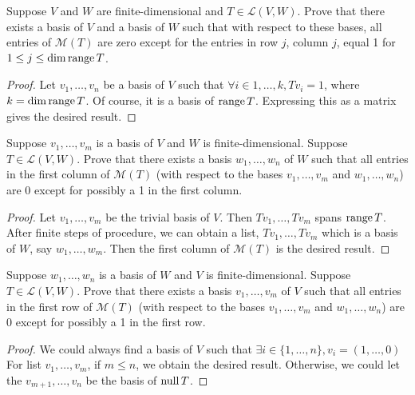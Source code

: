 \begin{exercise}
Suppose $V$ and $W$ are finite-dimensional and $T \in \mathcal{L}(V,W)$. Prove that there exists a basis of $V$ and a basis of $W$ such that with respect to these bases, all entries of $\mathcal{M}(T)$ are zero except for the entries in row $j$, column $j$, equal 1 for $1 \le j \le \operatorname{dim}\mathop{\mathrm{range}} T$.
\end{exercise}

\begin{proof}
	Let $v_1, \ldots , v_n$ be a basis of $V$ such that $\forall i \in {1, \ldots, k}, Tv_i = 1$,
	where $k = \operatorname{dim}\mathop{\mathrm{range}} T$.
	Of course, it is a basis of $\mathop{\mathrm{range}} T$. Expressing this as a matrix gives the desired result.
\end{proof}

\begin{exercise}
Suppose $v_1, \ldots ,v_m$ is a basis of $V$ and $W$ is finite-dimensional.
Suppose $T \in \mathcal{L}(V,W)$. Prove that there exists a basis $w_1, \ldots ,w_n$
of $W$ such that all entries in the first column of $\mathcal{M}(T)$ (with respect to
the bases $v_1, \ldots ,v_m$ and $w_1, \ldots ,w_n$) are 0 except for possibly a 1 in
the first column.
\end{exercise}
\begin{proof}
	Let $v_1 , \ldots , v_m$ be the trivial basis of $V$. Then $Tv_1, \ldots , Tv_m$ spans $\mathop{\mathrm{range}} T$. After finite steps of procedure, we can obtain a list, $Tv_1, \ldots ,Tv_m$ which is a basis of $W$, say $w_1, \ldots , w_m$. Then the first column of $\mathcal{M}(T)$ is the desired result.
\end{proof}

\begin{exercise}
Suppose $w_1, \ldots ,w_n$ is a basis of $W$ and $V$ is finite-dimensional. Suppose $T \in \mathcal{L}(V,W)$. Prove that there exists a basis $v_1, \ldots ,v_m$ of $V$ such that all entries in the first row of $\mathcal{M}(T)$ (with respect to the bases $v_1, \ldots ,v_m$ and $w_1, \ldots ,w_n$) are 0 except for possibly a 1 in the first row.
\end{exercise}
\begin{proof}
	We could always find a basis of $V$ such that $\exists i \in \{1, \ldots ,n\}, v_i = (1, \ldots ,0)$
	For list $v_1, \ldots ,v_m$, if $m \le n$, we obtain the desired result. Otherwise, we could let the $v_{m+1}, \ldots , v_n$ be the basis of $\mathop{\mathrm{null}} T$.
\end{proof}

